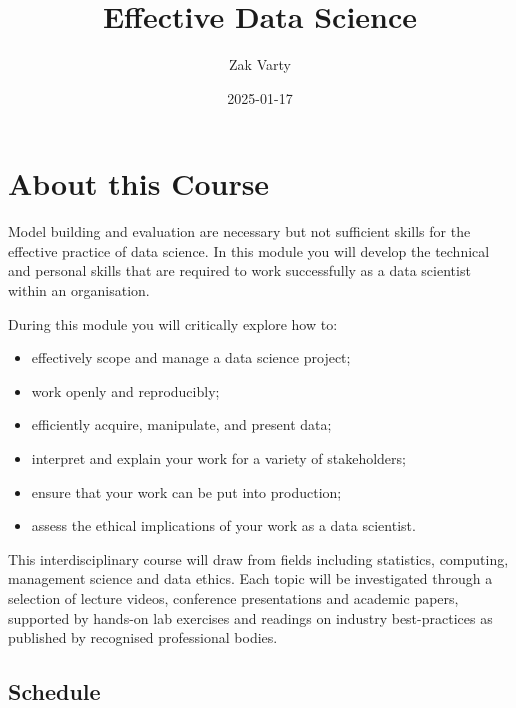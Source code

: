 \documentclass[
  letterpaper,
  DIV=11,
  numbers=noendperiod]{scrreprt}
\title{Effective Data Science}
\author{Zak Varty}
\date{2025-01-17}
\providecommand{\tightlist}{%
  \setlength{\itemsep}{0pt}\setlength{\parskip}{0pt}}\usepackage{longtable,booktabs,array}
\renewcommand*\contentsname{Table of contents}
\newcommand\contentsname{Table of contents}
\begin{document}
\maketitle

\renewcommand*\contentsname{Table of contents}
{
\hypersetup{linkcolor=}
\setcounter{tocdepth}{2}
\tableofcontents
}

\chapter*{About this Course}\label{about-this-course}


Model building and evaluation are necessary but not sufficient skills
for the effective practice of data science. In this module you will
develop the technical and personal skills that are required to work
successfully as a data scientist within an organisation.

During this module you will critically explore how to:

\begin{itemize}
\tightlist
\item
  effectively scope and manage a data science project;
\item
  work openly and reproducibly;
\item
  efficiently acquire, manipulate, and present data;
\item
  interpret and explain your work for a variety of stakeholders;
\item
  ensure that your work can be put into production;
\item
  assess the ethical implications of your work as a data scientist.
\end{itemize}

This interdisciplinary course will draw from fields including
statistics, computing, management science and data ethics. Each topic
will be investigated through a selection of lecture videos, conference
presentations and academic papers, supported by hands-on lab exercises
and readings on industry best-practices as published by recognised
professional bodies.

\section*{Schedule}\label{schedule}
\end{document}

